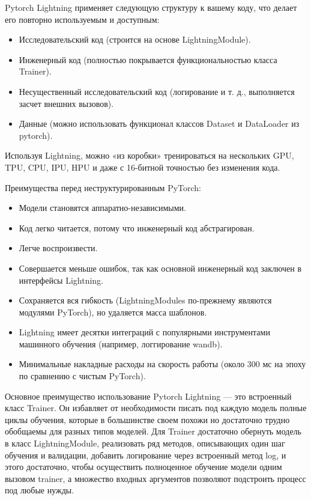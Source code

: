 Pytorch Lightning применяет следующую структуру к вашему коду, что делает его повторно используемым и доступным:

\begin{itemize}
	\item Исследовательский код (строится на основе LightningModule).
	\item Инженерный код (полностью покрывается функциональностью класса Trainer).
	\item Несущественный исследовательский код (логирование и т. д., выполняется засчет внешних вызовов).
	\item Данные (можно использовать функционал классов Dataset и DataLoader из pytorch).
\end{itemize}

Используя Lightning, можно «из коробки» тренироваться на нескольких GPU, TPU, CPU, IPU, HPU и даже с 16-битной точностью без изменения кода.

Преимущества перед неструктурированным PyTorch:

\begin{itemize}
	\item Модели становятся аппаратно-независимыми.
	\item Код легко читается, потому что инженерный код абстрагирован.
	\item Легче воспроизвести.
	\item Совершается меньше ошибок, так как основной инженерный код заключен в интерфейсы Lightning.
	\item Сохраняется вся гибкость (LightningModules по-прежнему являются модулями PyTorch), но удаляется масса шаблонов.
	\item Lightning имеет десятки интеграций с популярными инструментами машинного обучения (например, логгирование wandb).
	\item Минимальные накладные расходы на скорость работы (около 300 мс на эпоху по сравнению с чистым PyTorch).
\end{itemize}

Основное преимущество использование Pytorch Lightning --- это встроенный класс Trainer. Он избавляет от необходимости писать под каждую модель полные циклы обучения, которые в большинстве своем похожи но достаточно трудно обобщаемы для разных типов моделей. Для Trainer достаточно обернуть модель в класс LightningModule, реализовать ряд методов, описывающих один шаг обучения и валидации, добавить логирование через встроенный метод log, и этого достаточно, чтобы осуществить полноценное обучение модели одним вызовом trainer, а множество входных аргументов позволяют подстроить процесс под любые нужды.

